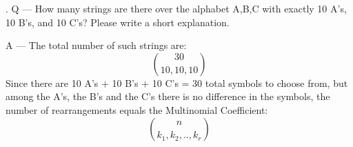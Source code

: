 \documentclass{article}
\newcounter{question}
\begin{document}
\newcommand\Que[1]{%
   \leavevmode\par
   \stepcounter{question}
   \noindent
   \thequestion. Q --- #1\par}

\newcommand\Ans[2][]{%
    \leavevmode\par\noindent
   {\leftskip37pt
    A --- \textbf{#1}#2\par}}

\Que{How many strings are there over the alphabet {A,B,C} with exactly 10 A's, 10 B's, and 10 C's? Please write a short explanation.}
\Ans{
    The total number of such strings are:
    \[
        30\choose 10,10,10
    \]
    Since there are 10 A's + 10 B's + 10 C's = 30 total symbols to choose from, 
    but among the A's, the B's and the C's there is no difference in the symbols, the number of rearrangements equals the Multinomial Coefficient:
    \[
        n\choose{k_1,k_2,..,k_r}
    \]
    }
\end{document}
